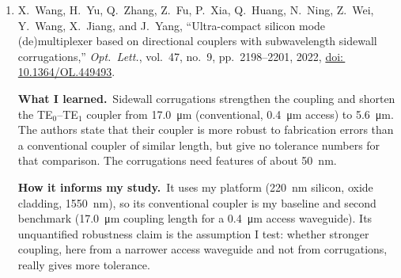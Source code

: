 \documentclass[12pt,a4paper]{article}
\newcommand{\TE}[1]{TE$_{#1}$}
\newcommand{\doi}[1]{\href{https://doi.org/#1}{doi:\,#1}}
\newcommand{\learned}{\textbf{What I learned.}\ }
\newcommand{\informs}{\textbf{How it informs my study.}\ }
\begin{document}
\begin{enumerate}
\item \label{ref:wang}
  X.~Wang, H.~Yu, Q.~Zhang, Z.~Fu, P.~Xia, Q.~Huang, N.~Ning, Z.~Wei, Y.~Wang,
  X.~Jiang, and J.~Yang, ``Ultra-compact silicon mode (de)multiplexer based on
  directional couplers with subwavelength sidewall corrugations,''
  \emph{Opt.\ Lett.}, vol.~47, no.~9, pp.~2198--2201, 2022, \doi{10.1364/OL.449493}.

  \learned Sidewall corrugations strengthen the coupling and shorten the
  \TE{0}--\TE{1} coupler from \qty{17.0}{\um} (conventional, \qty{0.4}{\um} access)
  to \qty{5.6}{\um}. The authors state that their coupler is more robust to
  fabrication errors than a conventional coupler of similar length, but give no
  tolerance numbers for that comparison. The corrugations need features of about
  \qty{50}{\nm}.

  \informs It uses my platform (\qty{220}{\nm} silicon, oxide cladding,
  \qty{1550}{\nm}), so its conventional coupler is my baseline and second benchmark
  (\qty{17.0}{\um} coupling length for a \qty{0.4}{\um} access waveguide). Its unquantified
  robustness claim is the assumption I test: whether stronger coupling, here from a
  narrower access waveguide and not from corrugations, really gives more tolerance.

\end{enumerate}
\end{document}
